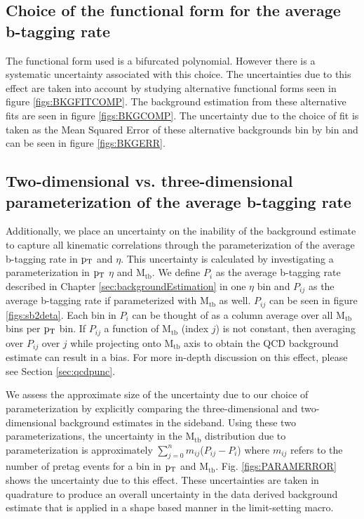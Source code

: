 \subsection{Choice of the functional form for the average b-tagging rate}
\label{sec:choiceoffit}
The functional form used is a bifurcated polynomial.
However there is a systematic uncertainty associated with this choice.
The uncertainties due to this effect are taken into account by
studying alternative functional forms seen in figure
\ref{figs:BKGFITCOMP}.  The background estimation from these
alternative fits are seen in figure \ref{figs:BKGCOMP}.  The
uncertainty due to the choice of fit is taken as the Mean Squared
Error of these alternative backgrounds bin by bin and can be seen in
figure \ref{figs:BKGERR}.  


\subsection{Two-dimensional  vs. three-dimensional parameterization of the average b-tagging rate}
\label{sec:paramerrors1}
Additionally, we place an uncertainty on the inability of the
background estimate to capture all kinematic correlations through the
parameterization of the average b-tagging rate in $\mathrm{p_{T}}$ and $\eta$.
This uncertainty is calculated by investigating a parameterization in
$\mathrm{p_{T}}$ $\eta$ and $\mathrm{M_{tb}}$.  We define $P_i$ as the average b-tagging
rate described in Chapter \ref{sec:backgroundEstimation} in one
$\eta$ bin and $P_{ij}$ as the average b-tagging rate if parameterized
with $\mathrm{M_{tb}}$ as well.  $P_{ij}$ can be seen in
figure \ref{figs:sb2deta}.  Each bin in $P_i$ can be thought of as a
column average over all $\mathrm{M_{tb}}$ bins per $\mathrm{p_{T}}$ bin.  If $P_{ij}$ a
function of $\mathrm{M_{tb}}$ (index $j$) is not constant, then averaging over
$P_{ij}$ over $j$ while projecting onto $\mathrm{M_{tb}}$ axis to obtain the
QCD background estimate can result in a bias.  For more in-depth
discussion on this effect, please see Section \ref{sec:qcdpunc}.

We assess the approximate size of the uncertainty due to our choice of
parameterization by explicitly comparing the three-dimensional and
two-dimensional background estimates in the sideband.  Using these two
parameterizations, the uncertainty in the $\mathrm{M_{tb}}$ distribution due to
parameterization is approximately $\displaystyle\sum\limits_{j=0}^n
m_{ij}$($P_{ij}-P_i$) where $m_{ij}$ refers to the number of pretag
events for a bin in $\mathrm{p_{T}}$ and $\mathrm{M_{tb}}$.  Fig. \ref{figs:PARAMERROR}
shows the uncertainty due to this effect. These uncertainties are
taken in quadrature to produce an overall uncertainty in the data
derived background estimate that is applied in a shape based manner in
the limit-setting macro.

